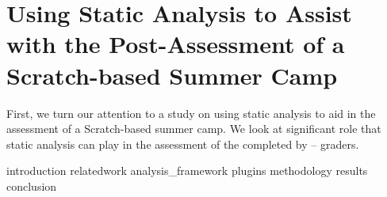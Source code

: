 \chapter{Using Static Analysis to Assist with the Post-Assessment of a
               Scratch-based Summer Camp}
\label{chap:hairball}

\def\currentprefix{hairball}

First, we turn our attention to a study on using static analysis to aid in the
assessment of a Scratch-based summer camp. We look at significant role that
static analysis can play in the assessment of the  completed by
 --  graders.

{introduction}
{relatedwork}
{analysis_framework}
{plugins}
{methodology}
{results}
{conclusion}
